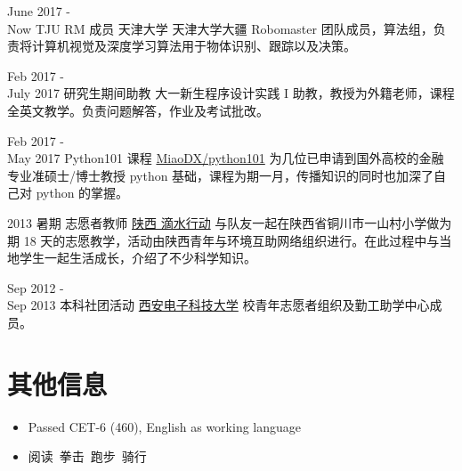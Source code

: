 \documentclass[utf8]{twentysecondcv} %
\begin{document}
\begin{twenty}

\twentyitem
    {June 2017 - \\ Now}
    {TJU RM 成员}
    {天津大学}
    {}
   	{天津大学大疆 Robomaster 团队成员，算法组，负责将计算机视觉及深度学习算法用于物体识别、跟踪以及决策。}

\twentyitem
    {Feb 2017 - \\ July 2017}
    {研究生期间助教}
	{}
    {}
    {大一新生程序设计实践 I 助教，教授为外籍老师，课程全英文教学。负责问题解答，作业及考试批改。}


\twentyitem
    {Feb 2017 - \\ May 2017}
    {Python101 课程}
    {\href{https://github.com/MiaoDX/python101}{MiaoDX/python101}}
    {}
    {为几位已申请到国外高校的金融专业准硕士/博士教授 python 基础，课程为期一月，传播知识的同时也加深了自己对 python 的掌握。}
    
\twentyitem
    {2013 暑期}
    {志愿者教师}
    {\href{http://blog.sina.com.cn/xiaanedu}{陕西 滴水行动}}
    {}
    {与队友一起在陕西省铜川市一山村小学做为期 18 天的志愿教学，活动由陕西青年与环境互助网络组织进行。在此过程中与当地学生一起生活成长，介绍了不少科学知识。}    
    
\twentyitem
    {Sep 2012 - \\ Sep 2013}
    {本科社团活动}
    {\href{http://www.xidian.edu.cn/}{西安电子科技大学}}
    {}
    {校青年志愿者组织及勤工助学中心成员。}

    
\end{twenty}



\section{其他信息}

\begin{twenty} %
    
\twentyitem
    {}
    {}
    {}
    {}
    {        
        {\begin{itemize}
            \item Passed CET-6 (460), English as working language
            \item 阅读\ 拳击\ 跑步\ 骑行     
        \end{itemize}
         }
    }    
        
\end{twenty}
\end{document}
